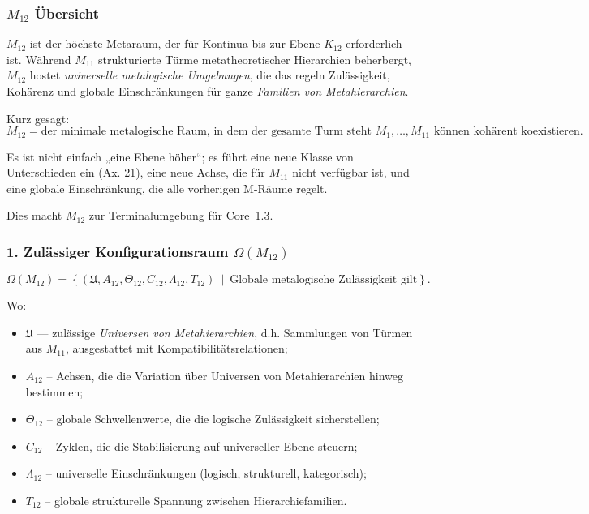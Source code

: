 

\subsubsection{$M_{12}$ Übersicht}
\label{sec:m12-overview}

$M_{12}$ ist der höchste Metaraum, der für Kontinua bis zur Ebene $K_{12}$ erforderlich ist.
Während $M_{11}$ strukturierte Türme metatheoretischer Hierarchien beherbergt,
$M_{12}$ hostet \emph{universelle metalogische Umgebungen}, die das regeln
Zulässigkeit, Kohärenz und globale Einschränkungen für ganze \emph{Familien von
Metahierarchien}.

Kurz gesagt:
\[
M_{12} = \text{der minimale metalogische Raum, in dem der gesamte Turm steht }
M_1, \ldots, M_{11} \text{ können kohärent koexistieren.}
\]

Es ist nicht einfach „eine Ebene höher“;
es führt eine neue Klasse von Unterschieden ein (Ax. 21),
eine neue Achse, die für $M_{11}$ nicht verfügbar ist,
und eine globale Einschränkung, die alle vorherigen M-Räume regelt.

Dies macht $M_{12}$ zur Terminalumgebung für Core~1.3.

\subsubsection*{1. Zulässiger Konfigurationsraum $\Omega(M_{12})$}

\[
\Omega(M_{12}) =
\left\{
\left( \mathfrak{U}, A_{12}, \Theta_{12},
C_{12}, \Lambda_{12}, T_{12} \right)
\ \middle|\
\text{Globale metalogische Zulässigkeit gilt}
\right\}.
\]

Wo:

\begin{itemize}
    \item $\mathfrak{U}$ — zulässige \emph{Universen von Metahierarchien},
          d.h. Sammlungen von Türmen aus $M_{11}$, ausgestattet mit Kompatibilitätsrelationen;
    \item $A_{12}$ – Achsen, die die Variation über Universen von Metahierarchien hinweg bestimmen;
    \item $\Theta_{12}$ – globale Schwellenwerte, die die logische Zulässigkeit sicherstellen;
    \item $C_{12}$ – Zyklen, die die Stabilisierung auf universeller Ebene steuern;
    \item $\Lambda_{12}$ – universelle Einschränkungen (logisch, strukturell, kategorisch);
    \item $T_{12}$ – globale strukturelle Spannung zwischen Hierarchiefamilien.
\end{itemize}

